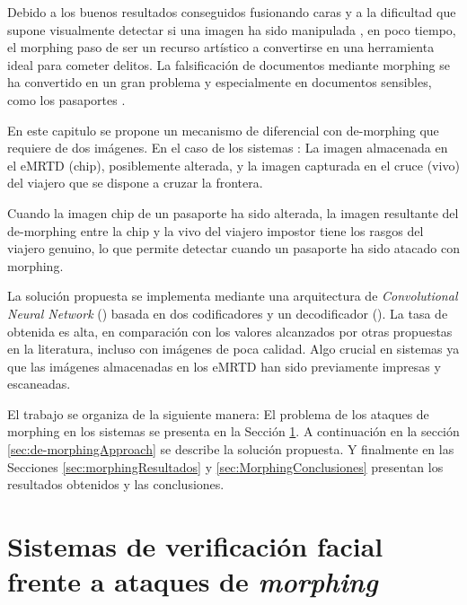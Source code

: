 Debido a los buenos resultados conseguidos fusionando caras y a la dificultad que supone visualmente detectar si una imagen ha sido manipulada \cite{beale1995categorical} \cite{levin2000categorical} \cite{robertson2018detecting}, en poco tiempo, el \gls{morphing} paso de ser un recurso artístico a convertirse en una herramienta ideal para cometer delitos. La falsificación de documentos mediante \gls{morphing} se ha convertido en un gran problema \cite{scherhag2017vulnerability} \cite{makrushin2017automatic} y especialmente en documentos sensibles, como los pasaportes \cite{ferrara2014magic}.

En este capitulo se propone un mecanismo de  diferencial con \gls{de-morphing} que requiere de dos imágenes. En el caso de los sistemas : La imagen almacenada en el \gls{eMRTD} (\gls{chip}), posiblemente alterada, y la imagen capturada en el cruce (\gls{vivo}) del viajero que se dispone a cruzar la frontera.

Cuando la imagen \gls{chip} de un pasaporte ha sido alterada, la imagen resultante del \gls{de-morphing} entre  la \gls{chip} y la \gls{vivo} del viajero \gls{impostor} tiene los rasgos del viajero \gls{genuino}, lo que permite detectar cuando un pasaporte ha sido atacado con \gls{morphing}.

La solución propuesta se implementa mediante una arquitectura de \textit{Convolutional Neural Network} () basada en dos codificadores y un decodificador (). La tasa de obtenida es alta, en comparación con los valores alcanzados por otras propuestas en la literatura, incluso con imágenes de poca calidad. Algo crucial en sistemas  ya que las imágenes almacenadas en los \gls{eMRTD} han sido previamente impresas y escaneadas.

El trabajo se organiza de la siguiente manera: El problema de los ataques de \gls{morphing} en los sistemas  se presenta en la Sección \ref{sec:VerificationMorphingAttack}. A continuación en la sección \ref{sec:de-morphingApproach} se describe la solución propuesta. Y finalmente en las Secciones \ref{sec:morphingResultados} y \ref{sec:MorphingConclusiones}  presentan los resultados obtenidos y las conclusiones.

\section{Sistemas de verificación facial frente a ataques de \textit{morphing}} \label{sec:VerificationMorphingAttack}

